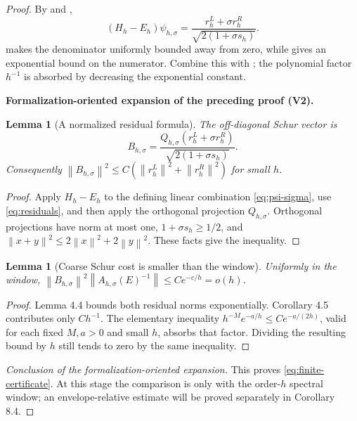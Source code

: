 \documentclass[11pt]{article}
\newtheorem{lemma}[theorem]{Lemma}
\newcommand{\formalisationparentid}{X}
\newenvironment{formalisationaddition}[1]{\par\medskip\begingroup\color{blue}\def\formalisationparentid{#1}\setcounter{formalizationsublemma}{0}\let\lemma\formalizationsublemma\let\endlemma\endformalizationsublemma
  \def\Eo{\mathcal E_h^\circ}\def\EE{\mathcal E_h}\def\phio{\phi_h^\circ}\def\phih{\phi_h}\def\Ho{H_h^{\rm atom}(v^\circ)}\def\Ha{H_h^{\rm atom}}\def\HL{H_h^{L}}\def\Dh{D_h}\def\Log{\operatorname{Log}}\def\ellh{\ell_h}\def\Gp{G_{p,h}}\def\Ast{A_{*,h}}\def\ahat{\widehat{\mathfrak a}_h}\def\ah{\mathfrak a_h}\def\rh{\widehat\rho_h}\def\deltah{\widehat\delta_h}\def\oldref##1{\textup{(##1)}}\def\interface##1{\par\noindent\textit{Analytical interface used here.} ##1\par}\def\finish{\par\noindent\textit{Conclusion of the formalization-oriented expansion.} }\par\noindent\textbf{Formalization-oriented expansion of the preceding proof (V2).}\par\smallskip
}{\par\endgroup\medskip
}
\newcommand{\norm}[1]{\left\|#1\right\|}
\begin{document}
\begin{proof}
By  and ,
\[
 (H_h-E_h)\psi_{h,\sigma}
 =\frac{r_h^L+\sigma r_h^R}{\sqrt{2(1+\sigma s_h)}}.
\]
 makes the denominator uniformly bounded away
from zero, while  gives an exponential
bound on the numerator.  Combine this with
; the polynomial factor $h^{-1}$ is absorbed
by decreasing the exponential constant.

\begin{formalisationaddition}{C4.6}
\begin{lemma}[A normalized residual formula]\label{sublemma:C4-6-residual-formula}
The off-diagonal Schur vector is
\[
 B_{h,\sigma}=\frac{Q_{h,\sigma}(r_h^L+\sigma r_h^R)}{\sqrt{2(1+\sigma s_h)}}.
\]
Consequently $\norm{B_{h,\sigma}}^2\le C(\norm{r_h^L}^2+\norm{r_h^R}^2)$ for small $h$.
\end{lemma}
\begin{proof}
Apply $H_h-E_h$ to the defining linear combination \eqref{eq:psi-sigma}, use \eqref{eq:residuals}, and then apply the orthogonal projection $Q_{h,\sigma}$. Orthogonal projections have norm at most one, $1+\sigma s_h\ge1/2$, and $\norm{x+y}^2\le2\norm x^2+2\norm y^2$. These facts give the inequality.
\end{proof}

\begin{lemma}[Coarse Schur cost is smaller than the window]\label{sublemma:C4-6-smallness}
Uniformly in the window, $\norm{B_{h,\sigma}}^2\norm{A_{h,\sigma}(E)^{-1}}\le Ce^{-c/h}=o(h)$.
\end{lemma}
\begin{proof}
Lemma 4.4 bounds both residual norms exponentially. Corollary 4.5 contributes only $Ch^{-1}$. The elementary inequality $h^{-M}e^{-a/h}\le Ce^{-a/(2h)}$, valid for each fixed $M,a>0$ and small $h$, absorbs that factor. Dividing the resulting bound by $h$ still tends to zero by the same inequality.
\end{proof}
\finish This proves \eqref{eq:finite-certificate}. At this stage the comparison is only with the order-$h$ spectral window; an envelope-relative estimate will be proved separately in Corollary 8.4.
\end{formalisationaddition}

\end{proof}
\end{document}
